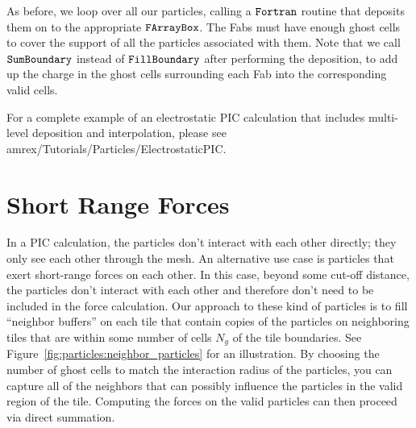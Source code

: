 As before, we loop over all our particles, calling a $\tt{Fortran}$ routine that deposits them on to the appropriate $\tt{FArrayBox}$. The Fabs must have enough ghost cells to
cover the support of all the particles associated with them. Note that we call $\tt{SumBoundary}$ instead of $\tt{FillBoundary}$ after performing the deposition, to add up the charge 
in the ghost cells surrounding each Fab into the corresponding valid cells.

For a complete example of an electrostatic PIC calculation that includes multi-level deposition and interpolation, please see amrex/Tutorials/Particles/ElectrostaticPIC.

\section{Short Range Forces}
\label{sec:Particles:ShortRange}

In a PIC calculation, the particles don't interact with each other directly; they only see each other through the mesh. An alternative use case is particles that exert short-range forces on each other. In this case, beyond some cut-off distance, the particles don't interact with each other and therefore don't need to be included in the force calculation. Our approach to these kind of particles is to fill ``neighbor buffers'' on each tile that contain copies of the particles on neighboring tiles that are within some number of cells $N_g$ of the tile boundaries. See Figure~\ref{fig:particles:neighbor_particles} for an illustration. By choosing the number of ghost cells to match the interaction radius of the particles, you can capture all of the neighbors that can possibly influence the particles in the valid region of the tile. Computing the forces on the valid particles can then proceed via direct summation.

